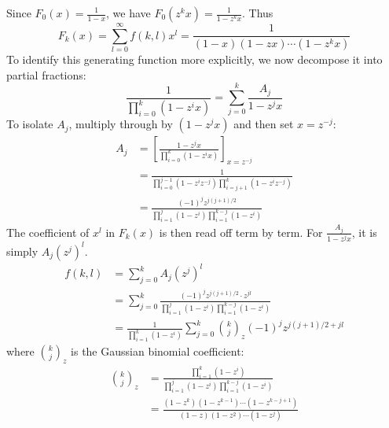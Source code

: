Since $F_{0}(x) = \frac{1}{1 - x}$, we have $F_{0}(z^{k}x) = \frac{1}{1 - z^{k}x}$. Thus
\begin{equation*}
    F_{k}(x) = \sum_{l = 0}^{\infty} f(k, l)x^{l} = \frac{1}{(1 - x)(1 - zx) \cdots (1 - z^{k}x)}
\end{equation*}
To identify this generating function more explicitly, we now decompose it into partial fractions:
\begin{equation*}
    \frac{1}{\prod_{i = 0}^{k}(1 - z^{i}x)} = \sum_{j = 0}^{k} \frac{A_{j}}{1 - z^{j}x}
\end{equation*}
To isolate $A_{j}$, multiply through by $(1 - z^{j}x)$ and then set $x = z^{-j}$:
\begin{equation*}
    \begin{aligned}
        A_{j}
        &= \left[\frac{1 - z^{j}x}{\prod_{i = 0}^{k}(1 - z^{i}x)}\right]_{x = z^{-j}} \\
        &= \frac{1}{\prod_{i = 0}^{j - 1}(1 - z^{i}z^{-j})\prod_{i = j + 1}^{k}(1 - z^{i}z^{-j})} \\
        &= \frac{(-1)^{j}z^{j(j + 1)/2}}{\prod_{i = 1}^{j}(1 - z^{i})\prod_{i = 1}^{k - j}(1 - z^{i})}
    \end{aligned}
\end{equation*}
The coefficient of $x^{l}$ in $F_{k}(x)$ is then read off term by term. For $\frac{A_{j}}{1 - z^{j}x}$, it is simply $A_{j}(z^{j})^{l}$.
\begin{equation*}
    \begin{aligned}
        f(k, l)
        &= \sum_{j = 0}^{k} A_{j}(z^{j})^{l} \\
        &= \sum_{j = 0}^{k} \frac{(-1)^{j}z^{j(j + 1)/2} \cdot z^{jl}}{\prod_{i = 1}^{j}(1 - z^{i})\prod_{i = 1}^{k - j}(1 - z^{i})} \\
        &= \frac{1}{\prod_{i = 1}^{k}(1 - z^{i})} \sum_{j = 0}^{k} \binom{k}{j}_{z}(-1)^{j}z^{j(j + 1)/2 + jl}
    \end{aligned}
\end{equation*}
where $\binom{k}{j}_{z}$ is the Gaussian binomial coefficient:
\begin{equation*}
    \begin{aligned}
        \binom{k}{j}_{z}
        &= \frac{\prod_{i = 1}^{k}(1 - z^{i})}{\prod_{i = 1}^{j}(1 - z^{i})\prod_{i = 1}^{k - j}(1 - z^{i})} \\
        &= \frac{(1 - z^{k})(1 - z^{k - 1}) \cdots (1 - z^{k - j + 1})}{(1 - z)(1 - z^{2}) \cdots (1 - z^{j})}
    \end{aligned}
\end{equation*}
